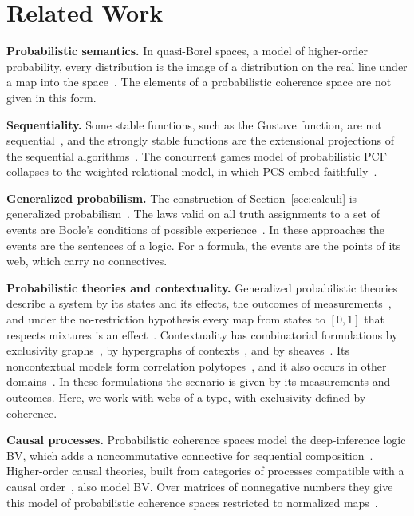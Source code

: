 \section{Related Work}
\label{sec:related}

\textbf{Probabilistic semantics.}
In quasi-Borel spaces, a
model of higher-order probability, every distribution is the image of a
distribution on the real line under a map into the
space~\cite{heunen2017qbs}. The elements of a probabilistic coherence
space are not given in this form.

\textbf{Sequentiality.}
Some stable functions, such as the Gustave function, are not
sequential~\cite{curien2003}, and the strongly stable functions are the
extensional projections of the sequential
algorithms~\cite{berry-curien1982,ehrhard1996}. The concurrent games
model of probabilistic PCF collapses to the weighted relational model, in
which PCS embed faithfully~\cite{castellan2018}.

\textbf{Generalized probabilism.}
The construction of Section~\ref{sec:calculi} is generalized
probabilism~\cite{paris2001,williams2012}. The laws valid on all truth
assignments to a set of events are Boole's conditions of possible
experience~\cite{pitowsky1994}.
In these approaches the events are the sentences of a logic. For a formula, the events are the points of its web, which carry no
connectives.

\textbf{Probabilistic theories and contextuality.}
Generalized probabilistic theories describe a system by its states and
its effects, the outcomes of measurements~\cite{barrett2007,plavala2023},
and under the no-restriction hypothesis every map from states to $[0,1]$
that respects mixtures is an effect~\cite{janotta-lal2013}. Contextuality has
combinatorial formulations by exclusivity graphs~\cite{cabello2014}, by
hypergraphs of contexts~\cite{acin2015}, and by
sheaves~\cite{abramsky-brandenburger2011}. Its noncontextual models form
correlation polytopes~\cite{pitowsky1991}, and it also occurs in other
domains~\cite{abramsky2013}. In these formulations the scenario is given
by its measurements and outcomes. Here, we work with webs of a type, with
exclusivity defined by coherence.

\textbf{Causal processes.}
Probabilistic coherence spaces model the deep-inference logic BV, which
adds a noncommutative connective for sequential
composition~\cite{blute-panangaden-slavnov2012}. Higher-order causal
theories, built from categories of processes compatible with a causal
order~\cite{kissinger-uijlen2019}, also model BV. Over matrices of nonnegative numbers they give this model of probabilistic coherence spaces
restricted to normalized maps~\cite{simmons-kissinger2022}.
